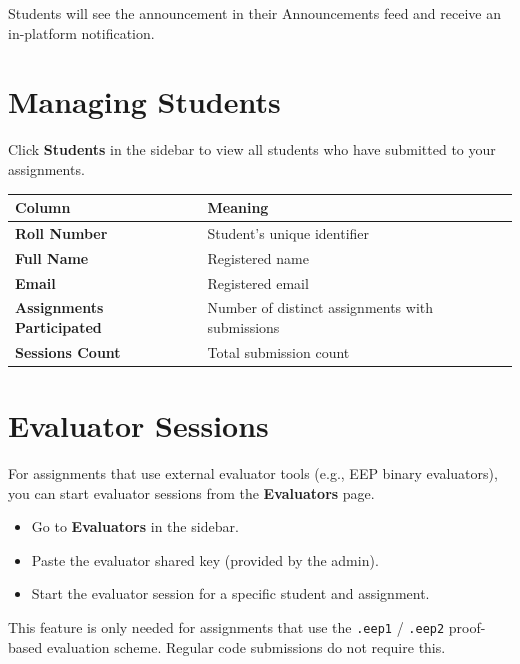 \documentclass[12pt,a4paper]{article}
\begin{document}
Students will see the announcement in their Announcements feed and receive an in-platform notification.

\section{Managing Students}

Click \textbf{Students} in the sidebar to view all students who have submitted to your assignments.

\begin{center}
\begin{tabularx}{\linewidth}{>{\bfseries}lX}
\toprule
Column & Meaning \\
\midrule
Roll Number           & Student's unique identifier \\
Full Name             & Registered name \\
Email                 & Registered email \\
Assignments Participated & Number of distinct assignments with submissions \\
Sessions Count        & Total submission count \\
\bottomrule
\end{tabularx}
\end{center}

\section{Evaluator Sessions}

For assignments that use external evaluator tools (e.g., EEP binary evaluators), you can start evaluator sessions from the \textbf{Evaluators} page.

\begin{itemize}
  \item Go to \textbf{Evaluators} in the sidebar.
  \item Paste the evaluator shared key (provided by the admin).
  \item Start the evaluator session for a specific student and assignment.
\end{itemize}

\begin{infobox}
  This feature is only needed for assignments that use the \texttt{.eep1} / \texttt{.eep2} proof-based evaluation scheme. Regular code submissions do not require this.
\end{infobox}
\end{document}
